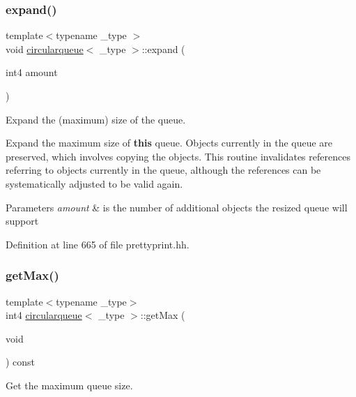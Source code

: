 \subsubsection{\texorpdfstring{expand()}{expand()}}
{\footnotesize\ttfamily template$<$typename \+\_\+type $>$ \\
void \mbox{\hyperlink{classcircularqueue}{circularqueue}}$<$ \+\_\+type $>$\+::expand (\begin{DoxyParamCaption}\item[{int4}]{amount }\end{DoxyParamCaption})}



Expand the (maximum) size of the queue. 

Expand the maximum size of {\bfseries{this}} queue. Objects currently in the queue are preserved, which involves copying the objects. This routine invalidates references referring to objects currently in the queue, although the references can be systematically adjusted to be valid again. 
\begin{DoxyParams}{Parameters}
{\em amount} & is the number of additional objects the resized queue will support \\
\hline
\end{DoxyParams}


Definition at line 665 of file prettyprint.\+hh.

\mbox{\label{classcircularqueue_a61a4ec11faa1e93786f6a8ddf0fa147a}} 
\subsubsection{\texorpdfstring{getMax()}{getMax()}}
{\footnotesize\ttfamily template$<$typename \+\_\+type$>$ \\
int4 \mbox{\hyperlink{classcircularqueue}{circularqueue}}$<$ \+\_\+type $>$\+::get\+Max (\begin{DoxyParamCaption}\item[{void}]{ }\end{DoxyParamCaption}) const\hspace{0.3cm}{\ttfamily [inline]}}



Get the maximum queue size. 




